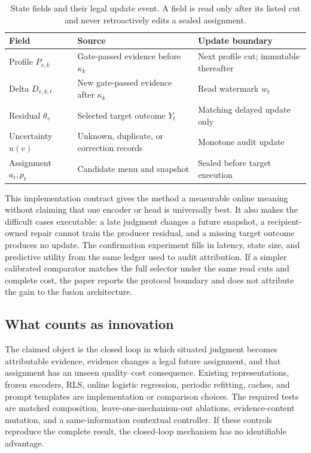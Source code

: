 \documentclass[sigconf,anonymous]{aamas}
\begin{document}
\begin{table}[t]
\centering\scriptsize
\setlength{\tabcolsep}{2pt}
\caption{State fields and their legal update event. A field is read only after its listed cut and never retroactively edits a sealed assignment.}
\label{tab:state-contract}
\begin{tabular}{p{}p{}p{}}
\toprule
Field & Source & Update boundary \\
\midrule
Profile $P_{v,k}$ & Gate-passed evidence before $\kappa_k$ & Next profile cut; immutable thereafter \\
Delta $D_{v,k,t}$ & New gate-passed evidence after $\kappa_k$ & Read watermark $w_t$ \\
Residual $\theta_v$ & Selected target outcome $Y_t$ & Matching delayed update only \\
Uncertainty $u(v)$ & Unknown, duplicate, or correction records & Monotone audit update \\
Assignment $a_t,p_t$ & Candidate menu and snapshot & Sealed before target execution \\
\bottomrule
\end{tabular}
\end{table}

This implementation contract gives the method a measurable online meaning without claiming that one encoder or head is universally best. It also makes the difficult cases executable: a late judgment changes a future snapshot, a recipient-owned repair cannot train the producer residual, and a missing target outcome produces no update. The confirmation experiment fills in latency, state size, and predictive utility from the same ledger used to audit attribution. If a simpler calibrated comparator matches the full selector under the same read cuts and complete cost, the paper reports the protocol boundary and does not attribute the gain to the fusion architecture.

\subsection{What counts as innovation}
The claimed object is the closed loop in which situated judgment becomes attributable evidence, evidence changes a legal future assignment, and that assignment has an unseen quality--cost consequence. Existing representations, frozen encoders, RLS, online logistic regression, periodic refitting, caches, and prompt templates are implementation or comparison choices. The required tests are matched composition, leave-one-mechanism-out ablations, evidence-content mutation, and a same-information contextual controller. If these controls reproduce the complete result, the closed-loop mechanism has no identifiable advantage.
\end{document}
